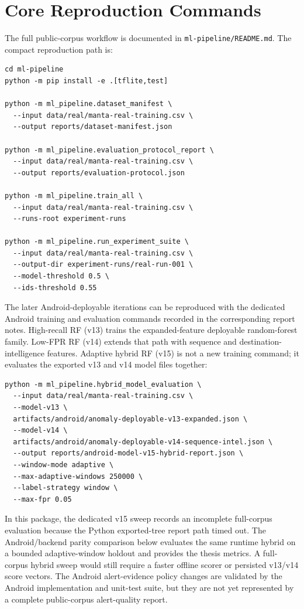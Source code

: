 \section{Core Reproduction Commands}
The full public-corpus workflow is documented in \texttt{ml-pipeline/README.md}. The compact
reproduction path is:
\begin{verbatim}
cd ml-pipeline
python -m pip install -e .[tflite,test]

python -m ml_pipeline.dataset_manifest \
  --input data/real/manta-real-training.csv \
  --output reports/dataset-manifest.json

python -m ml_pipeline.evaluation_protocol_report \
  --input data/real/manta-real-training.csv \
  --output reports/evaluation-protocol.json

python -m ml_pipeline.train_all \
  --input data/real/manta-real-training.csv \
  --runs-root experiment-runs

python -m ml_pipeline.run_experiment_suite \
  --input data/real/manta-real-training.csv \
  --output-dir experiment-runs/real-run-001 \
  --model-threshold 0.5 \
  --ids-threshold 0.55
\end{verbatim}

The later Android-deployable iterations can be reproduced with the dedicated Android training and
evaluation commands recorded in the corresponding report notes. High-recall RF (v13) trains the
expanded-feature deployable random-forest family. Low-FPR RF (v14) extends that path with sequence
and destination-intelligence features. Adaptive hybrid RF (v15) is not a new training command; it
evaluates the exported v13 and v14 model files together:
\begin{verbatim}
python -m ml_pipeline.hybrid_model_evaluation \
  --input data/real/manta-real-training.csv \
  --model-v13 \
  artifacts/android/anomaly-deployable-v13-expanded.json \
  --model-v14 \
  artifacts/android/anomaly-deployable-v14-sequence-intel.json \
  --output reports/android-model-v15-hybrid-report.json \
  --window-mode adaptive \
  --max-adaptive-windows 250000 \
  --label-strategy window \
  --max-fpr 0.05
\end{verbatim}
In this package, the dedicated v15 sweep records an incomplete full-corpus evaluation because the
Python exported-tree report path timed out. The Android/backend parity comparison below evaluates
the same runtime hybrid on a bounded adaptive-window holdout and provides the thesis metrics. A
full-corpus hybrid sweep would still require a faster offline scorer or persisted v13/v14 score
vectors. The Android alert-evidence policy changes are validated by the Android implementation and
unit-test suite, but they are not yet represented by a complete public-corpus alert-quality report.

